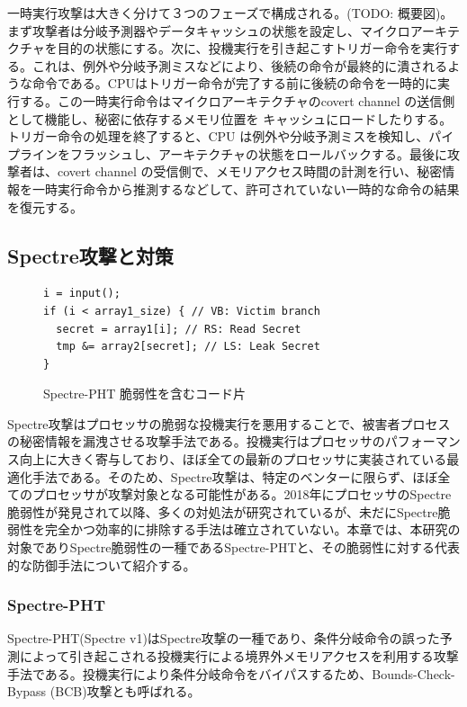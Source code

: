 一時実行攻撃は大きく分けて３つのフェーズで構成される。{\color{red}(TODO: 概要図)}。
まず攻撃者は分岐予測器やデータキャッシュの状態を設定し、マイクロアーキテクチャを目的の状態にする。次に、投機実行を引き起こすトリガー命令を実行する。これは、例外や分岐予測ミスなどにより、後続の命令が最終的に潰されるような命令である。CPUはトリガー命令が完了する前に後続の命令を一時的に実行する。この一時実行命令はマイクロアーキテクチャのcovert channel の送信側として機能し、秘密に依存するメモリ位置を キャッシュにロードしたりする。トリガー命令の処理を終了すると、CPU は例外や分岐予測ミスを検知し、パイプラインをフラッシュし、アーキテクチャの状態をロールバックする。最後に攻撃者は、covert channel の受信側で、メモリアクセス時間の計測を行い、秘密情報を一時実行命令から推測するなどして、許可されていない一時的な命令の結果を復元する。


\subsection{Spectre攻撃と対策}

\begin{figure}
  \begin{verbatim}
i = input();
if (i < array1_size) { // VB: Victim branch
  secret = array1[i]; // RS: Read Secret 
  tmp &= array2[secret]; // LS: Leak Secret  
}
\end{verbatim}
  \caption{Spectre-PHT 脆弱性を含むコード片}
  \label{BCB}
\end{figure}

Spectre攻撃\cite{8835233,Spectre-v4,220586,10.1145/3243734.3243761}はプロセッサの脆弱な投機実行を悪用することで、被害者プロセスの秘密情報を漏洩させる攻撃手法である。投機実行はプロセッサのパフォーマンス向上に大きく寄与しており、ほぼ全ての最新のプロセッサに実装されている最適化手法である。そのため、Spectre攻撃は、特定のベンターに限らず、ほぼ全てのプロセッサが攻撃対象となる可能性がある。2018年にプロセッサのSpectre脆弱性が発見されて以降、多くの対処法が研究されているが、未だにSpectre脆弱性を完全かつ効率的に排除する手法は確立されていない。本章では、本研究の対象でありSpectre脆弱性の一種であるSpectre-PHT\cite{8835233}と、その脆弱性に対する代表的な防御手法について紹介する。

\subsubsection{Spectre-PHT}
Spectre-PHT(Spectre v1)\cite{8835233}はSpectre攻撃の一種であり、条件分岐命令の誤った予測によって引き起こされる投機実行による境界外メモリアクセスを利用する攻撃手法である。投機実行により条件分岐命令をバイパスするため、Bounds-Check-Bypass (BCB)攻撃とも呼ばれる。\par


